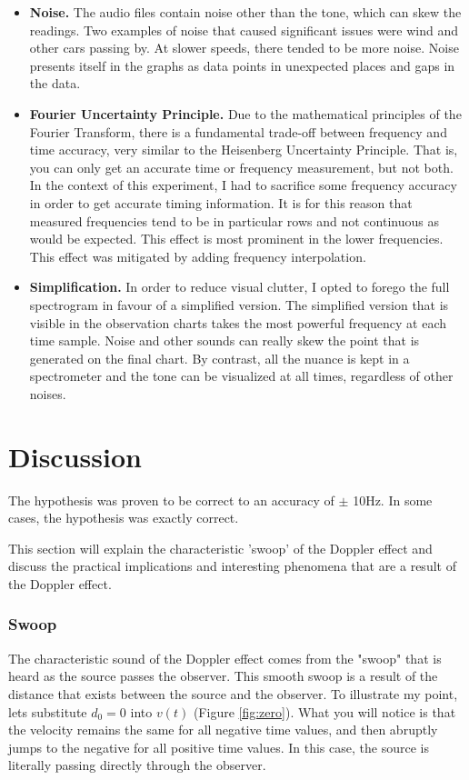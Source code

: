 \documentclass[12pt]{article}
\begin{document}
\begin{itemize}
\item \textbf{Noise.} The audio files contain noise other than the tone, which can skew the readings. Two examples of noise that caused significant issues were wind and other cars passing by. At slower speeds, there tended to be more noise. Noise presents itself in the graphs as data points in unexpected places and gaps in the data.
\item \textbf{Fourier Uncertainty Principle.} Due to the mathematical principles of the Fourier Transform, there is a fundamental trade-off between frequency and time accuracy, very similar to the Heisenberg Uncertainty Principle. That is, you can only get an accurate time or frequency measurement, but not both. In the context of this experiment, I had to sacrifice some frequency accuracy in order to get accurate timing information. It is for this reason that measured frequencies tend to be in particular rows and not continuous as would be expected. This effect is most prominent in the lower frequencies. This effect was mitigated by adding frequency interpolation.
\item \textbf{Simplification.} In order to reduce visual clutter, I opted to forego the full spectrogram in favour of a simplified version. The simplified version that is visible in the observation charts takes the most powerful frequency at each time sample. Noise and other sounds can really skew the point that is generated on the final chart. By contrast, all the nuance is kept in a spectrometer and the tone can be visualized at all times, regardless of other noises.
\end{itemize}


\section{Discussion}
The hypothesis was proven to be correct to an accuracy of $\pm$ 10Hz. In some cases, the hypothesis was exactly correct.

This section will explain the characteristic 'swoop' of the Doppler effect and discuss the practical implications and interesting phenomena that are a result of the Doppler effect.


\subsubsection{Swoop}
The characteristic sound of the Doppler effect comes from the "swoop" that is heard as the source passes the observer. This smooth swoop is a result of the distance that exists between the source and the observer. To illustrate my point, lets substitute $d_0 = 0$ into $v(t)$ (Figure \ref{fig:zero}). What you will notice is that the velocity remains the same for all negative time values, and then abruptly jumps to the negative for all positive time values. In this case, the source is literally passing directly through the observer. 
\end{document}
